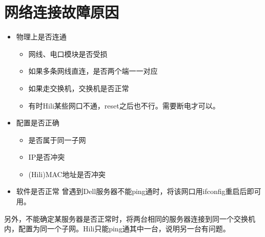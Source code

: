 
\section{网络连接故障原因}
\begin{itemize}
    \item 物理上是否连通
        \begin{itemize}
            \item 网线、电口模块是否受损
            \item 如果多条网线直连，是否两个端一一对应
            \item 如果走交换机，交换机是否正常
            \item 有时Hili某些网口不通，reset之后也不行。需要断电才可以。

        \end{itemize}
    \item 配置是否正确
        \begin{itemize}
            \item 是否属于同一子网
            \item IP是否冲突
            \item (Hili)MAC地址是否冲突
        \end{itemize}
    \item 软件是否正常
        曾遇到Dell服务器不能ping通时，将该网口用ifconfig重启后即可用。
        
\end{itemize}

另外，不能确定某服务器是否正常时，将两台相同的服务器连接到同一个交换机内，配置为同一个子网。Hili只能ping通其中一台，说明另一台有问题。
